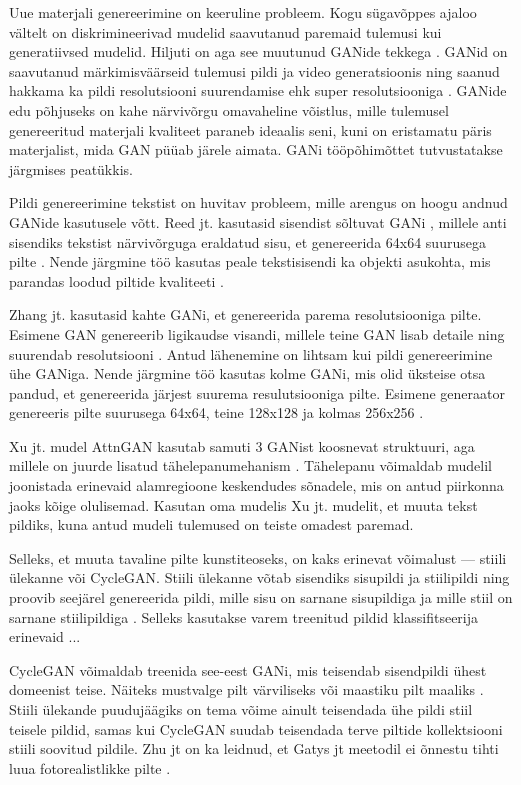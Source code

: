 \documentclass{vilgym}
\begin{document}
	Uue materjali genereerimine on keeruline probleem. Kogu sügavõppes ajaloo vältelt on diskrimineerivad mudelid saavutanud paremaid tulemusi kui generatiivsed mudelid. Hiljuti on aga see muutunud GANide tekkega \parencite{gan}. GANid on saavutanud märkimisväärseid tulemusi pildi \parencite{biggan} ja video generatsioonis \parencite{dvdgan} ning saanud hakkama ka pildi resolutsiooni suurendamise ehk super resolutsiooniga \parencite{srgan}. GANide edu põhjuseks on kahe närvivõrgu omavaheline võistlus, mille tulemusel genereeritud materjali kvaliteet paraneb ideaalis seni, kuni on eristamatu päris materjalist, mida GAN püüab järele aimata. GANi tööpõhimõttet tutvustatakse järgmises peatükkis.

	Pildi genereerimine tekstist on huvitav probleem, mille arengus on hoogu andnud GANide kasutusele võtt. Reed jt. kasutasid sisendist sõltuvat GANi , millele anti sisendiks tekstist närvivõrguga eraldatud sisu, et genereerida 64x64 suurusega pilte \parencite{reed}. Nende järgmine töö kasutas peale tekstisisendi ka objekti asukohta, mis parandas loodud piltide kvaliteeti \parencite{reed2}. 

	Zhang jt. kasutasid kahte GANi, et genereerida parema resolutsiooniga pilte. Esimene GAN genereerib ligikaudse visandi, millele teine GAN lisab detaile ning suurendab resolutsiooni \parencite{stackgan}. Antud lähenemine on lihtsam kui pildi genereerimine ühe GANiga. Nende järgmine töö kasutas kolme GANi, mis olid üksteise otsa pandud, et genereerida järjest suurema resulutsiooniga pilte. Esimene generaator genereeris pilte suurusega 64x64, teine 128x128 ja kolmas 256x256 \parencite{stackgan2}.

	Xu jt. mudel AttnGAN kasutab samuti 3 GANist koosnevat struktuuri, aga millele on juurde lisatud tähelepanumehanism \parencite{attngan}. Tähelepanu võimaldab mudelil joonistada erinevaid alamregioone keskendudes sõnadele, mis on antud piirkonna jaoks kõige olulisemad. Kasutan oma mudelis Xu jt. mudelit, et muuta tekst pildiks, kuna antud mudeli tulemused on teiste omadest paremad. 

	Selleks, et muuta tavaline pilte kunstiteoseks, on kaks erinevat võimalust --- stiili ülekanne või CycleGAN. Stiili ülekanne võtab sisendiks sisupildi ja stiilipildi ning proovib seejärel genereerida pildi, mille sisu on sarnane sisupildiga ja mille stiil on sarnane stiilipildiga \parencite{styletransfer}.
	Selleks kasutakse varem treenitud pildid klassifitseerija erinevaid ... 

	CycleGAN võimaldab treenida see-eest GANi, mis teisendab sisendpildi ühest domeenist teise. Näiteks mustvalge pilt värviliseks või maastiku pilt maaliks \parencite{cyclegan}. Stiili ülekande puudujäägiks on tema võime ainult teisendada ühe pildi stiil teisele pildid, samas kui CycleGAN suudab teisendada terve piltide kollektsiooni stiili soovitud pildile. Zhu jt on ka leidnud, et Gatys jt meetodil ei õnnestu tihti luua fotorealistlikke pilte \parencite{cyclegan}.
\end{document}
